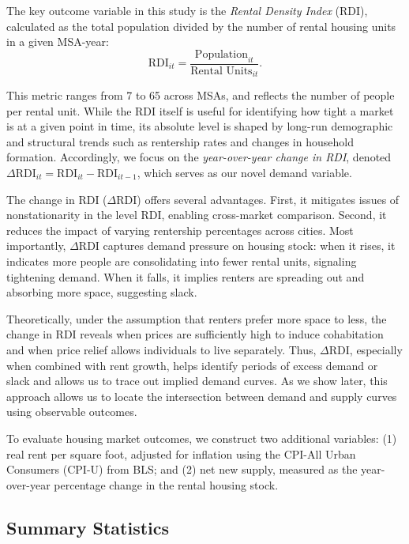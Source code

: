 \documentclass[sn-mathphys-num]{sn-jnl}%
\theoremstyle{thmstyleone}%
\theoremstyle{thmstyletwo}%
\theoremstyle{thmstylethree}%
\begin{document}
The key outcome variable in this study is the \textit{Rental Density Index} (RDI), calculated as the total population divided by the number of rental housing units in a given MSA-year:
\begin{equation}
	\text{RDI}_{it} = \frac{\text{Population}_{it}}{\text{Rental Units}_{it}}.
\end{equation}

This metric ranges from 7 to 65 across MSAs, and reflects the number of people per rental unit. While the RDI itself is useful for identifying how tight a market is at a given point in time, its absolute level is shaped by long-run demographic and structural trends such as rentership rates and changes in household formation. Accordingly, we focus on the \textit{year-over-year change in RDI}, denoted \( \Delta \text{RDI}_{it} = \text{RDI}_{it} - \text{RDI}_{it-1} \), which serves as our novel demand variable.

The change in RDI (\( \Delta \text{RDI} \)) offers several advantages. First, it mitigates issues of nonstationarity in the level RDI, enabling cross-market comparison. Second, it reduces the impact of varying rentership percentages across cities. Most importantly, \( \Delta \text{RDI} \) captures demand pressure on housing stock: when it rises, it indicates more people are consolidating into fewer rental units, signaling tightening demand. When it falls, it implies renters are spreading out and absorbing more space, suggesting slack.

Theoretically, under the assumption that renters prefer more space to less, the change in RDI reveals when prices are sufficiently high to induce cohabitation and when price relief allows individuals to live separately. Thus, \( \Delta \text{RDI} \), especially when combined with rent growth, helps identify periods of excess demand or slack and allows us to trace out implied demand curves. As we show later, this approach allows us to locate the intersection between demand and supply curves using observable outcomes.

To evaluate housing market outcomes, we construct two additional variables: (1) real rent per square foot, adjusted for inflation using the CPI-All Urban Consumers (CPI-U) from BLS; and (2) net new supply, measured as the year-over-year percentage change in the rental housing stock.

\subsection{Summary Statistics}
\end{document}
